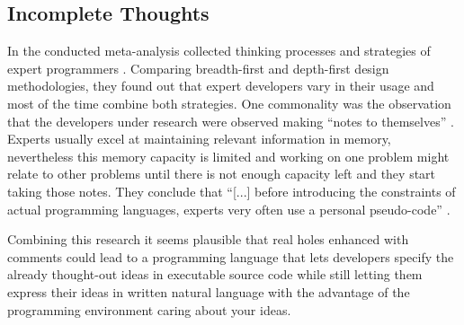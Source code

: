 \subsection{Incomplete Thoughts}
\label{sub:incomplete-thoughts}
In the \citeyear{visser_expert_1990} conducted meta-analysis  \citeauthor{visser_expert_1990} collected thinking processes and strategies of expert programmers \autocite{visser_expert_1990}.
Comparing breadth-first and depth-first design methodologies, they found out that expert developers vary in their usage and most of the time combine both strategies.
One commonality was the observation that the developers under research were observed making ``notes to themselves'' \autocite[241]{visser_expert_1990}.
Experts usually excel at maintaining relevant information in memory, nevertheless this memory capacity is limited and working on one problem might relate to other problems until there is not enough capacity left and they start taking those notes.
They conclude that ``[...] before introducing the constraints of actual programming languages, experts very often use a personal pseudo-code'' \autocite[242]{visser_expert_1990}.

Combining this research it seems plausible that real holes enhanced with comments could lead to a programming language that lets developers specify the already thought-out ideas in executable source code while still letting them express their ideas in written natural language with the advantage of the programming environment caring about your ideas.


